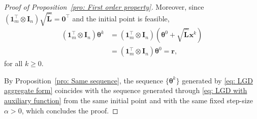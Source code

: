 \documentclass{siamart251216}
\begin{document}
\begin{proof}[Proof of Proposition~\ref{pro: First order property}]
    Moreover, since
    $(\bm{1}_{m}^{\top}\otimes\mathbf{I}_{n})
    \sqrt{\hat{\mathbf{L}}}=\bm{0}^{\top}$
    and the initial point is feasible,
    \[
        \begin{aligned}
        (\bm{1}_{m}^{\top}\otimes\mathbf{I}_{n})
        \boldsymbol{\theta}^{k}
        &=
        (\bm{1}_{m}^{\top}\otimes\mathbf{I}_{n})
        \left(
        \boldsymbol{\theta}^{0}
        +
        \sqrt{\hat{\mathbf{L}}}\mathbf{x}^{k}
        \right)\\
        &=
        (\bm{1}_{m}^{\top}\otimes\mathbf{I}_{n})
        \boldsymbol{\theta}^{0}
        =
        \bm{r},
        \end{aligned}
    \]
    for all $k\ge0$.

    By Proposition~\ref{pro: Same sequence}, the sequence
    $\{\boldsymbol{\theta}^{k}\}$ generated by
    \eqref{eq: LGD aggregate form} coincides with the sequence
    generated through \eqref{eq: LGD with auxiliary function}
    from the same initial point and with the same fixed step-size
    $\alpha>0$, which concludes the proof.
\end{proof}
\end{document}
